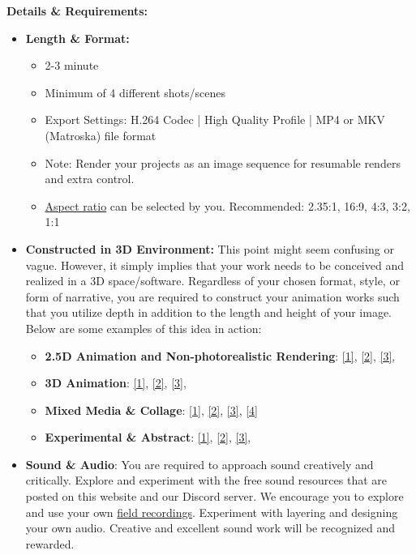 \textbf{Details \& Requirements:}
\begin{itemize}
	\tightlist
	\item \textbf{Length \& Format:}
	      \begin{itemize}
		      \item 2-3 minute
		      \item Minimum of 4 different shots/scenes
		      \item Export Settings: H.264 Codec | High Quality Profile | MP4 or MKV (Matroska) file format
		      \item Note: Render your projects as an image sequence for resumable renders and extra control. 
		      \item \href{https://en.wikipedia.org/wiki/Aspect_ratio_(image)#/media/File:Filmaspectratios.svg}{Aspect ratio} can be selected by you. Recommended: 2.35:1, 16:9, 4:3, 3:2, 1:1
	      \end{itemize}
	\item \textbf{Constructed in 3D Environment:} This point might seem confusing or vague. However, it simply implies that your work needs to be conceived and realized in a 3D space/software. Regardless of your chosen format, style, or form of narrative, you are required to construct your animation works such that you utilize depth in addition to the length and height of your image. Below are some examples of this idea in action:
	      \begin{itemize}
		      \item \textbf{2.5D Animation and Non-photorealistic Rendering}: \href{https://www.youtube.com/watch?v=Cl_EhU7elyo}{[1]}, \href{https://www.youtube.com/watch?v=tobqZ8fMqBk}{[2]}, \href{https://www.youtube.com/watch?v=C8puJClvNYE}{[3]},
		      \item \textbf{3D Animation}: \href{https://vimeo.com/297358261}{[1]}, \href{https://vimeo.com/385177134}{[2]}, \href{https://www.youtube.com/watch?v=8-ig_lnO7uU}{[3]},
		      \item \textbf{Mixed Media \& Collage}: \href{https://vimeo.com/167957360}{[1]}, \href{https://vimeo.com/hiradsab/outlier}{[2]}, \href{https://vimeo.com/203361631}{[3]}, \href{https://vimeo.com/181219125}{[4]}
		      \item \textbf{Experimental \& Abstract}: \href{https://vimeo.com/275668389}{[1]}, \href{https://vimeo.com/238456535}{[2]}, \href{https://vimeo.com/291430458}{[3]},
	      \end{itemize}
	\item \textbf{Sound \& Audio}: You are required to approach sound creatively and critically. Explore and experiment with the free sound resources that are posted on this website and our Discord server. We encourage you to explore and use your own \href{https://en.wikipedia.org/wiki/Field_recording}{field recordings}. Experiment with layering and designing your own audio. Creative and excellent sound work will be recognized and rewarded.

\end{itemize}
